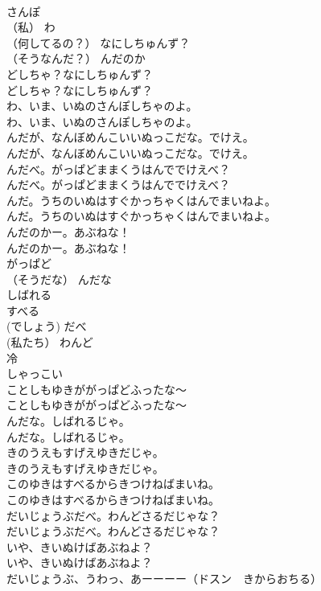 \documentclass[8pt]{extreport}
\begin{document}
\begin{CJK}{UTF8}{min}
\\	さんぽ
\\	（私）	わ
\\	（何してるの？）	なにしちゅんず？
\\	（そうなんだ？）	んだのか
\\	どしちゃ？なにしちゅんず？	
\\	どしちゃ？なにしちゅんず？ 
\\	わ、いま、いぬのさんぽしちゃのよ。	
\\	わ、いま、いぬのさんぽしちゃのよ。 
\\	んだが、なんぼめんこいいぬっこだな。でけえ。	
\\	んだが、なんぼめんこいいぬっこだな。でけえ。 
\\	んだべ。がっぱどままくうはんででけえべ？	
\\	んだべ。がっぱどままくうはんででけえべ？ 
\\	んだ。うちのいぬはすぐかっちゃくはんでまいねよ。	
\\	んだ。うちのいぬはすぐかっちゃくはんでまいねよ。 
\\	んだのかー。あぶねな！	
\\	んだのかー。あぶねな！ 
\\	がっぱど
\\	（そうだな）	んだな
\\	しばれる
\\	すべる
\\	(でしょう)	だべ
\\	(私たち）	わんど
\\	冷 
\\	しゃっこい
\\	ことしもゆきががっぱどふったな～	
\\	ことしもゆきががっぱどふったな～ 
\\	んだな。しばれるじゃ。	
\\	んだな。しばれるじゃ。 
\\	きのうえもすげえゆきだじゃ。	
\\	きのうえもすげえゆきだじゃ。 
\\	このゆきはすべるからきつけねばまいね。	
\\	このゆきはすべるからきつけねばまいね。 
\\	だいじょうぶだべ。わんどさるだじゃな？	
\\	だいじょうぶだべ。わんどさるだじゃな？ 
\\	いや、きいぬけばあぶねよ？	
\\	いや、きいぬけばあぶねよ？ 
\\	だいじょうぶ、うわっ、あーーーー（ドスン　きからおちる）	

\end{CJK}
\end{document}
